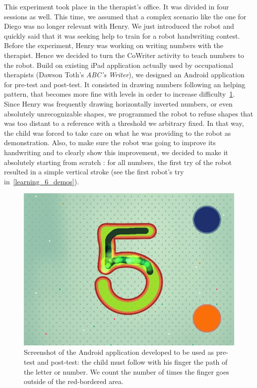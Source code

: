 \documentclass{article}
\begin{document}
This experiment took place in the therapist's office. It was divided in four
sessions as well. This time, we assumed that a complex scenario like the one for Diego was
no longer relevant with Henry. We just introduced the robot and quickly
said that it was seeking help to train for a robot handwriting contest.\\

Before the experiment, Henry was working on writing numbers with the therapist.
Hence we decided to turn the CoWriter activity to teach numbers to the robot. Build on
existing iPad application actually used by occupational therapists (Dawson Toth's \emph{ABC's
Writer}), we designed an Android application for pre-test and post-test. It consisted in drawing
numbers following an helping pattern, that becomes more fine with levels in
order to increase difficulty~\ref{fig:abc-writer}.\\

Since Henry was frequently drawing horizontally inverted numbers, or even
absolutely unrecognizable shapes, we programmed the robot to refuse shapes that
was too distant to a reference with a threshold we arbitrary fixed. In that way,
the child was forced to take care on what he was providing to the robot as
demonstration. Also, to make sure the robot was going to improve its handwriting
and to clearly show this improvement, we decided to make it absolutely starting
from scratch : for all numbers, the first try of the robot resulted in
a simple vertical stroke (see the first robot's try in~\ref{learning_6_demos}).

\begin{figure}
    \centering
    \includegraphics[width=0.9\linewidth]{abc-writer}
    \caption{\small Screenshot of the Android application developed to be used as
    pre-test and post-test: the child must follow with his finger the path of
the letter or number. We count the number of times the finger goes outside of
the red-bordered area.}
    \label{fig:abc-writer}
\end{figure}
\end{document}
